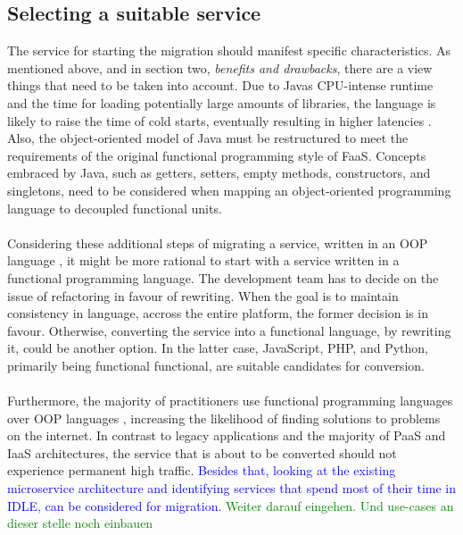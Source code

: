 \documentclass[11pt]{article}
\begin{document}
\subsection{Selecting a suitable service}
The service for starting the migration should manifest specific characteristics. As mentioned above, and in section two, \textit{benefits and drawbacks}, there are a view things that need to be taken into account. Due to Javas CPU-intense runtime and the time for loading potentially large amounts of libraries, the language is likely to raise the time of cold starts, eventually resulting in higher latencies \cite{bardsley2018serverless}. Also, the object-oriented model of Java must be restructured to meet the requirements of the original functional programming style of FaaS. Concepts embraced by Java, such as getters, setters, empty methods, constructors, and singletons, need to be considered when mapping an object-oriented programming language to decoupled functional units.\\\\ Considering these additional steps of migrating a service, written in an OOP language \cite{leitner2019mixed}, it might be more rational to start with a service written in a functional programming language. The development team has to decide on the issue of refactoring in favour of rewriting. When the goal is to maintain consistency in language, accross the entire platform, the former decision is in favour. Otherwise, converting the service into a functional language, by rewriting it, could be another option. In the latter case, JavaScript, PHP, and Python, primarily being functional functional, are suitable candidates for conversion.\\\\ Furthermore, the majority of practitioners use functional programming languages over OOP languages \cite{leitner2019mixed}, increasing the likelihood of finding solutions to problems on the internet. In contrast to legacy applications and the majority of PaaS and IaaS architectures, the service that is about to be converted should not experience permanent high traffic. \textcolor{blue}{Besides that, looking at the existing microservice architecture and identifying services that spend most of their time in IDLE, can be considered for migration.} \textcolor{green}{Weiter darauf eingehen. Und use-cases an dieser stelle noch einbauen}
\end{document}
